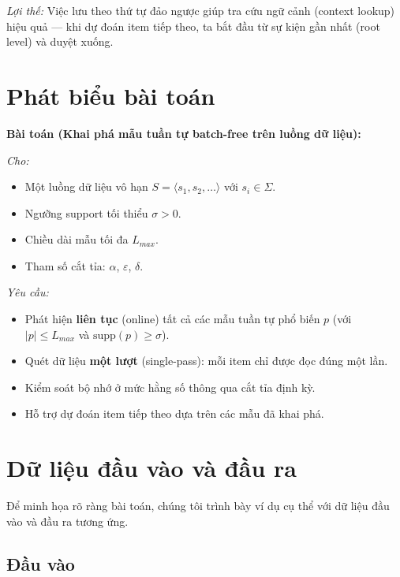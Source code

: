 \documentclass[14pt,a4paper,oneside]{extreport}
\begin{document}
\textit{Lợi thế:} Việc lưu theo thứ tự đảo ngược giúp tra cứu ngữ cảnh (context lookup) hiệu quả --- khi dự đoán item tiếp theo, ta bắt đầu từ sự kiện gần nhất (root level) và duyệt xuống.

\section{Phát biểu bài toán}
\label{sec:problem}


\textbf{Bài toán (Khai phá mẫu tuần tự batch-free trên luồng dữ liệu):}

\textit{Cho:}
\begin{itemize}
    \item Một luồng dữ liệu vô hạn $S = \langle s_1, s_2, \dots \rangle$ với $s_i \in \Sigma$.
    \item Ngưỡng support tối thiểu $\sigma > 0$.
    \item Chiều dài mẫu tối đa $L_{max}$.
    \item Tham số cắt tỉa: $\alpha$, $\varepsilon$, $\delta$.
\end{itemize}

\textit{Yêu cầu:}
\begin{itemize}
    \item Phát hiện \textbf{liên tục} (online) tất cả các mẫu tuần tự phổ biến $p$ (với $|p| \leq L_{max}$ và $\text{supp}(p) \geq \sigma$).
    \item Quét dữ liệu \textbf{một lượt} (single-pass): mỗi item chỉ được đọc đúng một lần.
    \item Kiểm soát bộ nhớ ở mức hằng số thông qua cắt tỉa định kỳ.
    \item Hỗ trợ dự đoán item tiếp theo dựa trên các mẫu đã khai phá.
\end{itemize}


\section{Dữ liệu đầu vào và đầu ra}
\label{sec:io}

Để minh họa rõ ràng bài toán, chúng tôi trình bày ví dụ cụ thể với dữ liệu đầu vào và đầu ra tương ứng.

\subsection{Đầu vào}
\end{document}

